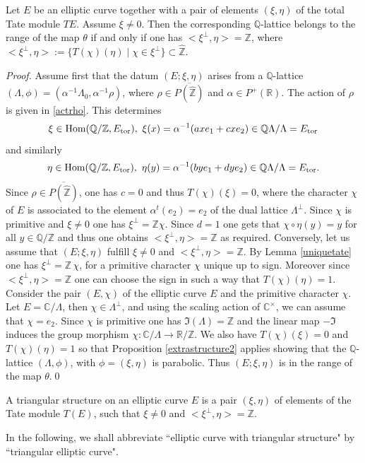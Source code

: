 \documentclass[graybox, envcountsect%
]{svmult}
\def\Hom{{\rm Hom}}
\def\C{{\mathbb C}}
\def\Q{{\mathbb Q}}
\def\R{{\mathbb R}}
\def\Z{{\mathbb Z}}
\def\Hom {{\mbox{Hom}}}
\begin{document}
\begin{theorem}\label{ellipticcurve} Let $E$ be an elliptic curve together with a
pair of elements $(\xi,\eta)$ of the total Tate module $TE$. Assume $\xi \neq 0$. Then the corresponding $\Q$-lattice belongs to the range of the map $\theta$ if and only if one has $<\xi^\perp,\eta>=\Z$, where $<\xi^\perp,\eta>:=\{T(\chi)(\eta)\mid \chi \in \xi^\perp\}\subset \hat \Z$.	
\end{theorem}
\begin{proof} Assume first that the datum $(E;\xi,\eta)$ arises from a $\Q$-lattice  $(\Lambda,\phi)=(\alpha^{-1}\Lambda_0, \alpha^{-1}\rho)$, where $\rho\in \overline{P(\hat \Z)}$ and $\alpha\in P^+(\R)$. 	
The action of $\rho$ is given in \eqref{actrho}.
 This determines 
$$
\xi \in \Hom(\Q/\Z,E_{\rm tor}), \ \xi(x)=\alpha^{-1}(ax e_1+cx e_2)\in \Q\Lambda/\Lambda=E_{\rm tor}
$$
and similarly 
$$
\eta \in \Hom(\Q/\Z,E_{\rm tor}), \ \eta(y)=\alpha^{-1}(by e_1+dy e_2)\in \Q\Lambda/\Lambda=E_{\rm tor}.
$$
Since $\rho\in \overline{P(\hat \Z)}$, one has $c=0$ and thus $T(\chi)(\xi)=0$, where the character $\chi$ of $E$ is associated to the element $\alpha^t(e_2)=e_2$ of the dual lattice $\Lambda^\perp$. Since $\chi$ is primitive and $\xi\neq 0$ one has $\xi^\perp=\Z\chi$. Since $d=1$ one gets that $\chi\circ \eta(y)=y$ for all $y\in \Q/\Z$ and thus one obtains $<\xi^\perp,\eta>=\Z$ as required. 
Conversely, let us assume that $(E;\xi,\eta)$ fulfill $\xi \neq 0$ and $<\xi^\perp,\eta>=\Z$. By Lemma \ref{uniquetate} one has $\xi^\perp= \Z\,\chi$, for a primitive character $\chi$ unique up to sign. Moreover since $<\xi^\perp,\eta>=\Z$ one can choose the sign in such a way that 
$T(\chi)(\eta)=1$. Consider the pair $(E,\chi)$ of the elliptic curve $E$ and the primitive character $\chi$. Let $E=\C/\Lambda$, then $\chi\in \Lambda^\perp$, and using the scaling action of $\C^\times$, we can assume that $\chi=e_2$. Since $\chi$ is primitive one has  $\Im(\Lambda)=\Z$ and the 
 linear map $-\Im$ induces the group morphism $\chi:\C/\Lambda\to \R/\Z$.  We also have $T(\chi)(\xi)=0$ and $T(\chi)(\eta)=1$ so that Proposition \ref{extrastructure2} applies  showing that the $\Q$-lattice $(\Lambda,\phi)$, with $\phi=(\xi,\eta)$ is parabolic. Thus $(E;\xi,\eta)$ is in the range of the map $\theta$.\qed \end{proof} 
 
 \begin{definition}\label{triangdefn} A triangular structure on an elliptic curve $E$ is a pair $(\xi,\eta)$ of elements of the Tate module $T(E)$, such that $\xi \neq 0$ and $<\xi^\perp,\eta>=\Z$. 	
 \end{definition}
  In the following, we shall abbreviate ``elliptic curve with triangular structure" by ``triangular elliptic curve". 
  
\end{document}
